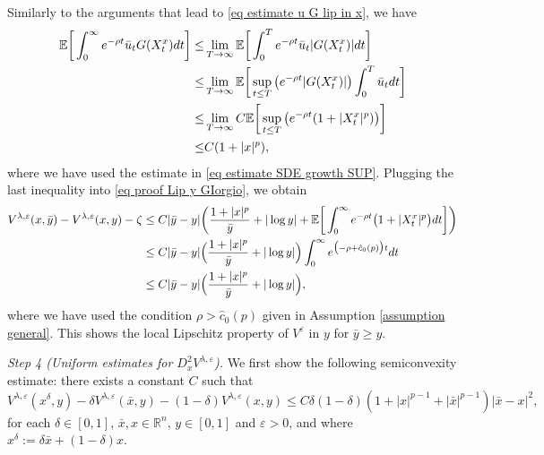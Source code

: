 \documentclass[11pt]{amsart}
\theoremstyle{plain}
\def \dd{{\rm d}}
\numberwithin{equation}{section}
\begin{document}
Similarly to the arguments that lead to \eqref{eq estimate u G lip in x}, we have
$$
\begin{aligned}
 \mathbb E  \bigg[ \int_0^\infty e ^{-\rho t}  \bar u_t  G(X_t^x) \dd t \bigg] \leq& \lim_{T \to \infty}
 \mathbb E  \bigg[ \int_0^T e ^{-\rho t}  \bar u _t  | G(X_t^x) | \dd t \bigg]\\ 
 \leq &\lim_{T \to \infty}   \mathbb E  \bigg[ \sup_{t \leq T} \big(e^{-\rho t}  |G(X_t^x)|\big) \int_0^T \bar u _t \dd t  \bigg]\\
 \leq &\lim_{T \to \infty}   C \mathbb E  \bigg[\sup_{t \leq T} \big(e^{-\rho t} ( 1 +  |X_t^{ x}|^{p} )\big)   \bigg]  \\
 \leq & C  (1 + |x|^{p}), 
\end{aligned}
$$
where we have used the estimate in \eqref{eq estimate SDE growth SUP}. 
Plugging the last inequality into \eqref{eq proof Lip y GIorgio}, we obtain
$$
\begin{aligned}
V^{\lambda, \varepsilon}( x, \bar y) - V^{\lambda, \varepsilon}(x,y) - \zeta 
  &\leq C |\bar y -y| \bigg( \frac{1+|x|^p}{\bar y}  + |\log y| + \mathbb E  \bigg[\int_0^\infty e ^{-\rho t} \big( 1   +  |X_t^{ x}|^{p} \big) \dd t   \bigg] \bigg) \\
   &\leq C |\bar y -y| \Big(  \frac{1+|x|^p}{\bar y}  + |\log y| \Big) \int_0^\infty e ^{ \big(-\rho +\hat c _0 (p) \big) t }   \dd t       \\
 & \leq C |\bar y -y| \Big( \frac{1+|x|^p}{\bar y}  + |\log y| \Big),
\end{aligned}
$$
where we have used the condition $\rho > \hat c _0(p)$ given in Assumption \ref{assumption general}.
This shows the local Lipschitz property of $V^\varepsilon$ in $y$ for $\bar y \geq y$. 

\smallbreak\noindent
\emph{Step 4 (Uniform  estimates for $ D^2_x V^{\lambda, \varepsilon}$).}
We first show the following semiconvexity estimate: there exists a constant $C$ such that
\begin{equation}
\label{eq semiconvexity}
V^{\lambda, \varepsilon}( x^\delta, y) - \delta V^{\lambda, \varepsilon}(\bar x, y) - (1-\delta)V^{\lambda, \varepsilon}( x,y) 
\leq  C \delta (1-\delta) ( 1 +|{x}|^{p-1}+ |\bar{x}|^{p-1} )  |\bar{x} - x|^2  , 
\end{equation} 
for each $\delta \in [0,1]$,  $\bar{x}, x \in \mathbb R^n$, $ y \in [0,1]$ and $\varepsilon >0$, and where
$x^\delta:=\delta \bar{x} + (1-\delta)x$.
\end{document}
